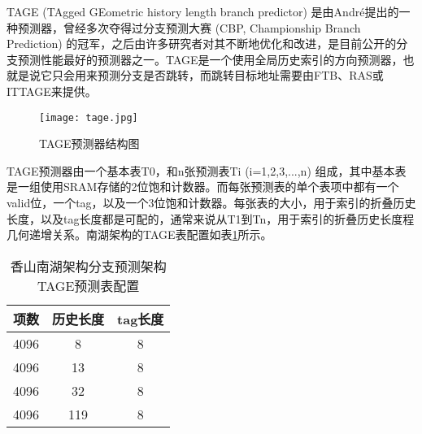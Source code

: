 TAGE (TAgged GEometric history length branch predictor) 是由André提出的一种预测器\cite{tage}，曾经多次夺得过分支预测大赛 (CBP, Championship Branch Prediction) 的冠军，之后由许多研究者对其不断地优化和改进，是目前公开的分支预测性能最好的预测器之一。TAGE是一个使用全局历史索引的方向预测器，也就是说它只会用来预测分支是否跳转，而跳转目标地址需要由FTB、RAS或ITTAGE来提供。


\begin{figure}[htb]
	\centering
	\setlength\tabcolsep{3pt}  %
	\vspace{5pt} %
	\texttt{[image: tage.jpg]}
	\caption{TAGE预测器结构图\cite{tage}}
	\label{fig:figure23}
\end{figure}

TAGE预测器由一个基本表T0，和n张预测表Ti (i=1,2,3,...,n) 组成，其中基本表是一组使用SRAM存储的2位饱和计数器。而每张预测表的单个表项中都有一个valid位，一个tag，以及一个3位饱和计数器。每张表的大小，用于索引的折叠历史长度，以及tag长度都是可配的，通常来说从T1到Tn，用于索引的折叠历史长度程几何递增关系。南湖架构的TAGE表配置如表\ref{tb:table21}所示。


\begin{table}[]
	\caption{香山南湖架构分支预测架构TAGE预测表配置}
	\label{tb:table21}
	\centering
    \begin{tabular}{ccc}
        \toprule
        项数 & 历史长度 & tag长度 \\
        \midrule
        4096 & 8 & 8 \\
        4096 & 13 & 8 \\
        4096 & 32 & 8 \\
		4096 & 119 & 8 \\
        \bottomrule
    \end{tabular}
\end{table}

